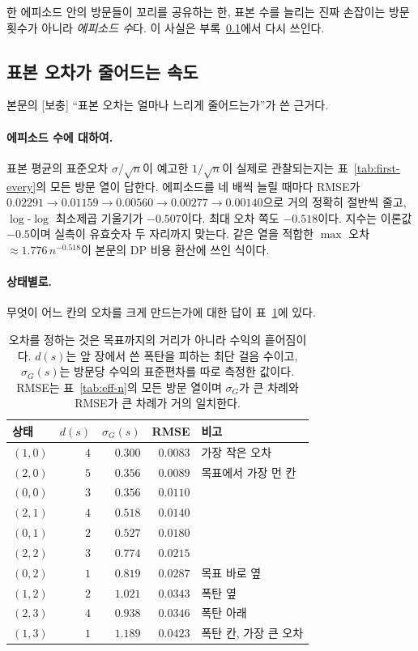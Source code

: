 \documentclass[11pt,a4paper]{article}
\begin{document}
한 에피소드 안의 방문들이 꼬리를 공유하는 한, 표본 수를 늘리는 진짜 손잡이는 방문 횟수가 아니라
\emph{에피소드 수}다. 이 사실은 부록~\ref{app:error-rate}에서 다시 쓰인다.

\subsection{표본 오차가 줄어드는 속도}
\label{app:error-rate}

본문의 [보충] ``표본 오차는 얼마나 느리게 줄어드는가''가 쓴 근거다.

\paragraph{에피소드 수에 대하여.}
표본 평균의 표준오차 $\sigma/\sqrt{n}$이 예고한 $1/\sqrt{n}$이 실제로 관찰되는지는
표~\ref{tab:first-every}의 모든 방문 열이 답한다. 에피소드를 네 배씩 늘릴 때마다 RMSE가
$0.02291 \to 0.01159 \to 0.00560 \to 0.00277 \to 0.00140$으로 거의 정확히 절반씩 줄고,
$\log$-$\log$ 최소제곱 기울기가 $-0.507$이다. 최대 오차 쪽도 $-0.518$이다. 지수는 이론값 $-0.5$이며
실측이 유효숫자 두 자리까지 맞는다. 같은 열을 적합한 $\max$ 오차 $\approx 1.776\,n^{-0.518}$이
본문의 DP 비용 환산에 쓰인 식이다.

\paragraph{상태별로.}
무엇이 어느 칸의 오차를 크게 만드는가에 대한 답이 표~\ref{tab:sigma}에 있다.

\begin{table}[htbp]
\centering
\caption{오차를 정하는 것은 목표까지의 거리가 아니라 수익의 흩어짐이다. $d(s)$는 앞 장에서 쓴 폭탄을
피하는 최단 걸음 수이고, $\sigma_G(s)$는 방문당 수익의 표준편차를 따로 측정한 값이다. RMSE는
표~\ref{tab:eff-n}의 모든 방문 열이며 $\sigma_G$가 큰 차례와 RMSE가 큰 차례가 거의 일치한다.}
\label{tab:sigma}
\small
\begin{tabular}{@{}lrrrl@{}}
\toprule
상태 & $d(s)$ & $\sigma_G(s)$ & RMSE & 비고 \\
\midrule
$(1,0)$ & $4$ & $0.300$ & $0.0083$ & 가장 작은 오차 \\
$(2,0)$ & $5$ & $0.356$ & $0.0089$ & 목표에서 가장 먼 칸 \\
$(0,0)$ & $3$ & $0.356$ & $0.0110$ & \\
$(2,1)$ & $4$ & $0.518$ & $0.0140$ & \\
$(0,1)$ & $2$ & $0.527$ & $0.0180$ & \\
$(2,2)$ & $3$ & $0.774$ & $0.0215$ & \\
$(0,2)$ & $1$ & $0.819$ & $0.0287$ & 목표 바로 옆 \\
$(1,2)$ & $2$ & $1.021$ & $0.0343$ & 폭탄 옆 \\
$(2,3)$ & $4$ & $0.938$ & $0.0346$ & 폭탄 아래 \\
$(1,3)$ & $1$ & $1.189$ & $0.0423$ & 폭탄 칸, 가장 큰 오차 \\
\bottomrule
\end{tabular}
\end{table}
\end{document}
